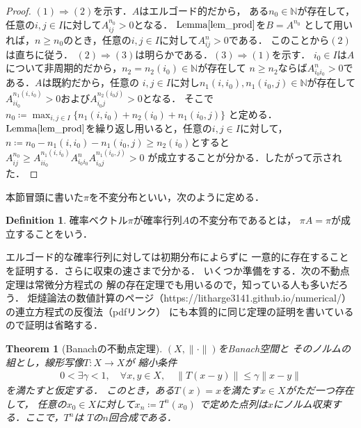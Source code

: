 \documentclass[dvipdfmx,autodetect-engine]{jsarticle}
\newtheorem{theorem}{Theorem}[section]
\theoremstyle{remark}
\theoremstyle{definition}
\newtheorem{definition}{Definition}[section]
\newcommand{\N}{\mathbb{N}}
\begin{document}
\begin{proof}
    $(1)\Rightarrow (2)$を示す．$A$はエルゴード的だから，
    ある$n_0 \in \N$が存在して，任意の$i,j \in I$に対して$A_{ij}^{n_0}>0$となる．
    $\mathrm{Lemma}\ref{lem_prod}$を$B = A^{n_0}$
    として用いれば，$n \geq n_0$のとき，任意の$i,j \in I$に対して$A_{ij}^n >0$である．
    このことから$(2)$は直ちに従う．
    $(2)\Rightarrow (3)$は明らかである．$(3) \Rightarrow (1)$を示す．
    $i_0 \in I$は$A$について非周期的だから，$n_2 = n_2(i_0) \in \N$が存在して
    $n \geq n_2$ならば$A_{i_{0} i_{0}}^{n}>0$である．$A$は既約だから，任意の
    $i,j \in I$に対し$n_1(i,i_0),n_1(i_0,j) \in \N$が存在して
    $A_{i i_0}^{n_1(i,i_0)} > 0$および$A_{i_0 j}^{n_2(i_0 j)}>0$となる．
    そこで$n_0 \coloneqq \max_{i,j \in I} \{n_1(i,i_0) + n_2(i_0) + n_1(i_0,j)\}$
    と定める．$\mathrm{Lemma}\ref{lem_prod}$を繰り返し用いると，任意の$i,j \in I$に対して，
    $n \coloneqq n_0 - n_1(i,i_0) - n_1(i_0,j) \geq n_2(i_0)$とすると
    $A_{ij}^{n_0} \geq A_{i i_0}^{n_1(i,i_0)} A_{i_0 i_0}^{n} A_{i_0 j}^{n_1(i_0,j)}>0$
    が成立することが分かる．したがって示された．
\end{proof}


本節冒頭に書いた$\pi$を不変分布といい，次のように定める．


\begin{definition}
    確率ベクトル$\pi$が確率行列$A$の不変分布であるとは，
    $\pi A = \pi$が成立することをいう．
\end{definition}


エルゴード的な確率行列に対しては初期分布によらずに
一意的に存在することを証明する．さらに収束の速さまで分かる．
いくつか準備をする．次の不動点定理は常微分方程式の
解の存在定理でも用いるので，知っている人も多いだろう．
炬燵論法の数値計算のページ（https://litharge3141.github.io/numerical/）
の連立方程式の反復法（pdfリンク）
にも本質的に同じ定理の証明を書いているので証明は省略する．


\begin{theorem}[Banachの不動点定理]
    $(X, \lVert \cdot \rVert)$をBanach空間と
    そのノルムの組とし，線形写像$T \colon X \to X$が
    縮小条件
    \begin{align}
        0 < \exists \gamma < 1,\quad \forall x,y \in X,\quad 
        \lVert T(x-y)\rVert \leq \gamma \lVert x-y \rVert
    \end{align}
    を満たすと仮定する．
    このとき，ある$T(x) = x$を満たす$x \in X$がただ一つ存在して，
    任意の$x_0 \in X$に対して$x_n \coloneqq T^n (x_0)$
    で定めた点列は$x$にノルム収束する．ここで，$T^n$は
    $T$の$n$回合成である．
\end{theorem}
\end{document}

